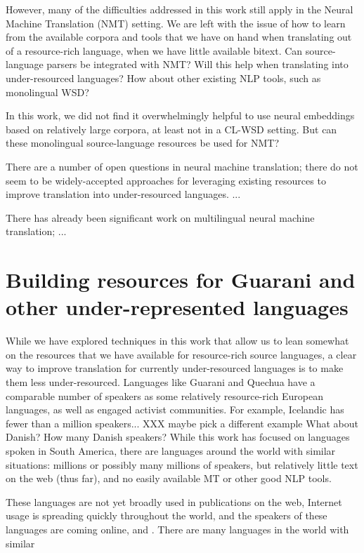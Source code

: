 However, many of the difficulties addressed in this work still apply in the
Neural Machine Translation (NMT) setting. We are left with the issue of how to
learn from the available corpora and tools that we have on hand when
translating out of a resource-rich language, when we have little available
bitext. Can source-language parsers be integrated with NMT? Will this help when
translating into under-resourced languages?
How about other existing NLP tools, such as monolingual WSD?

In this work, we did not find it overwhelmingly helpful to use neural
embeddings based on relatively large corpora, at least not in a CL-WSD setting.
But can these monolingual source-language resources be used for NMT?

There are a number of open questions in neural machine translation; there do
not seem to be widely-accepted approaches for leveraging existing resources to
improve translation into under-resourced languages. ... %

There has already been significant work on multilingual neural machine
translation; ...



\section{Building resources for Guarani and other under-represented languages}
\label{sec:crowdsourcing}

While we have explored techniques in this work that allow us to lean
somewhat on the resources that we have available for resource-rich source
languages, a clear way to improve translation for currently under-resourced
languages is to make them less under-resourced. Languages like Guarani and
Quechua have a comparable number of speakers as some relatively resource-rich
European languages, as well as engaged activist communities. For example,
Icelandic has fewer than a million speakers... XXX maybe pick a different
example
What about Danish? How many Danish speakers?
While this work has focused on languages spoken in South America, there are
languages around the world with similar situations: millions or possibly many
millions of speakers, but relatively little text on the web (thus far), and no
easily available MT or other good NLP tools.

These languages are not yet broadly used in publications on the web,
Internet usage is spreading quickly throughout the world, and
the speakers of these languages are coming online, and . There are many languages in
the world with similar 


